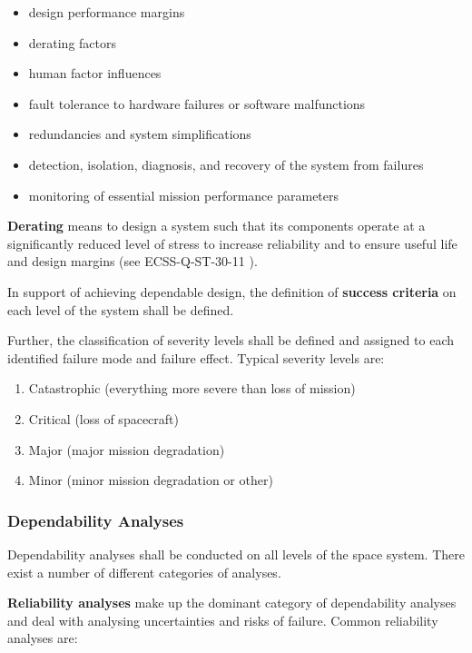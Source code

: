 \begin{itemize}
\item design performance margins
\item derating factors
\item human factor influences
\item fault tolerance to hardware failures or software malfunctions
\item redundancies and system simplifications
\item detection, isolation, diagnosis, and recovery of the system from failures
\item monitoring of essential mission performance parameters
\end{itemize}

\textbf{Derating} means to design a system such that its components operate at a significantly reduced level of stress to increase reliability and to ensure useful life and design margins (see ECSS-Q-ST-30-11 \cite{ECSS-Q-ST-30-11}).

In support of achieving dependable design, the definition of \textbf{success criteria} on each level of the system shall be defined.

Further, the classification of severity levels shall be defined and assigned to each identified failure mode and failure effect. Typical severity levels are:

\begin{enumerate}
\item Catastrophic (everything more severe than loss of mission)
\item Critical (loss of spacecraft)
\item Major (major mission degradation)
\item Minor (minor mission degradation or other)
\end{enumerate}

\subsubsection{Dependability Analyses}

Dependability analyses shall be conducted on all levels of the space system. There exist a number of different categories of analyses.

\textbf{Reliability analyses} make up the dominant category of dependability analyses and deal with analysing uncertainties and risks of failure. Common reliability analyses are:

